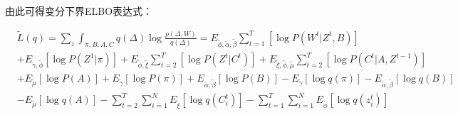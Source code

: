 


由此可得变分下界ELBO表达式：

\begin{equation}
\label{eq:3}
\begin{split}
&\widetilde{L}(q) = \sum_z \int_{\pi,B,A,C} q(\Delta) \log \frac{p(\Delta,W)}{q(\Delta)} 
= E_{\widetilde{\phi},\widetilde{\alpha},\widetilde{\beta}} \sum_{t=1}^T [\log P(W^t|Z^t,B)] \\
&+ E_{\widetilde{\gamma},\widetilde{\phi}}[\log P(Z^1|\pi)] + E_{\widetilde{\phi},\widetilde{\xi}} \sum_{t=2}^T [\log P(Z^t|C^t)] 
+ E_{\widetilde{\xi},\widetilde{\phi},\widetilde{\mu}} \sum_{t=2}^T [\log P(C^t|A,Z^{t-1})] \\
&+ E_{\widetilde{\mu}}[\log P(A)] + E_{\widetilde{\gamma}}[\log P(\pi)] + E_{\widetilde{\alpha},\widetilde{\beta}}[\log P(B)] 
- E_{\widetilde{\gamma}}[\log q(\pi)] - E_{\widetilde{\alpha},\widetilde{\beta}}[\log q(B)] \\
&- E_{\widetilde{\mu}}[\log q(A)] - \sum_{t=2}^T \sum_{i=1}^N E_{\widetilde{\xi}}[\log q(C_i^t)] - \sum_{t=1}^T \sum_{i=1}^N E_{\widetilde{\phi}}[\log q(z_i^t)] \\
\end{split}
\end{equation}

